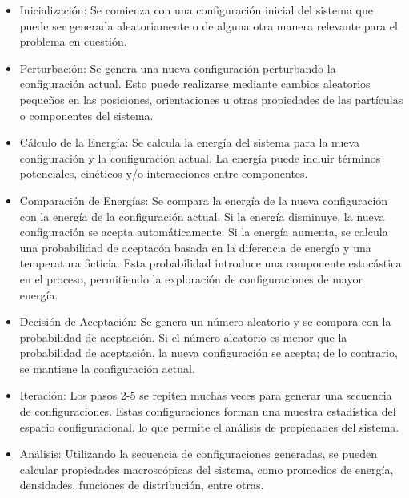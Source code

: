 \begin{itemize}
	

\item Inicializaci\'on: Se comienza con una configuraci\'on inicial del sistema que puede ser generada aleatoriamente o de alguna otra manera relevante para el problema en cuesti\'on.

\item Perturbaci\'on: Se genera una nueva configuraci\'on perturbando la configuraci\'on actual. Esto puede realizarse mediante cambios aleatorios peque\~nos en las posiciones, orientaciones u otras propiedades de las part\'iculas o componentes del sistema.

\item C\'alculo de la Energ\'ia: Se calcula la energ\'ia del sistema para la nueva configuraci\'on y la configuraci\'on actual. La energ\'ia puede incluir t\'erminos potenciales, cin\'eticos y/o interacciones entre componentes.

\item Comparaci\'on de Energ\'ias: Se compara la energ\'ia de la nueva configuraci\'on con la energ\'ia de la configuraci\'on actual. Si la energ\'ia disminuye, la nueva configuraci\'on se acepta autom\'aticamente. Si la energ\'ia aumenta, se calcula una probabilidad de aceptac\'on basada en la diferencia de energ\'ia y una temperatura ficticia. Esta probabilidad introduce una componente estoc\'astica en el proceso, permitiendo la exploraci\'on de configuraciones de mayor energ\'ia.

\item Decisi\'on de Aceptaci\'on: Se genera un n\'umero aleatorio y se compara con la probabilidad de aceptaci\'on. Si el n\'umero aleatorio es menor que la probabilidad de aceptaci\'on, la nueva configuraci\'on se acepta; de lo contrario, se mantiene la configuración actual.

\item Iteraci\'on: Los pasos 2-5 se repiten muchas veces para generar una secuencia de configuraciones. Estas configuraciones forman una muestra estad\'istica del espacio configuracional, lo que permite el an\'alisis de propiedades del sistema.

\item An\'alisis: Utilizando la secuencia de configuraciones generadas, se pueden calcular propiedades macrosc\'opicas del sistema, como promedios de energ\'ia, densidades, funciones de distribuci\'on, entre otras.
\end{itemize}

